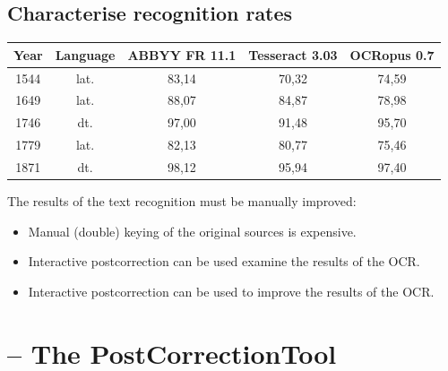 \subsection{Characterise recognition rates}
\begin{frame}
	\begin{table}
		\begin{tabular}{c c c c c}
			Year & Language & ABBYY FR 11.1 & Tesseract 3.03 & OCRopus 0.7 \\\hline
			1544 &   lat.   &    83,14      &     70,32      &      74,59 \\
			1649 &   lat.   &    88,07      &     84,87      &      78,98 \\
			1746 &   dt.    &    97,00      &     91,48      &      95,70 \\
			1779 &   lat.   &    82,13      &     80,77      &      75,46 \\
			1871 &   dt.    &    98,12      &     95,94      &      97,40 \\
		\end{tabular}
	\end{table}

	The results of the text recognition must be manually improved:
	\begin{itemize}
		\item Manual (double) keying of the original sources is expensive.
		\item Interactive postcorrection can be used examine the results of the
			OCR.
		\item Interactive postcorrection can be used to improve the results of the
			OCR.
	\end{itemize}
\end{frame}

\section{\pocoto{} -- The PostCorrectionTool}
